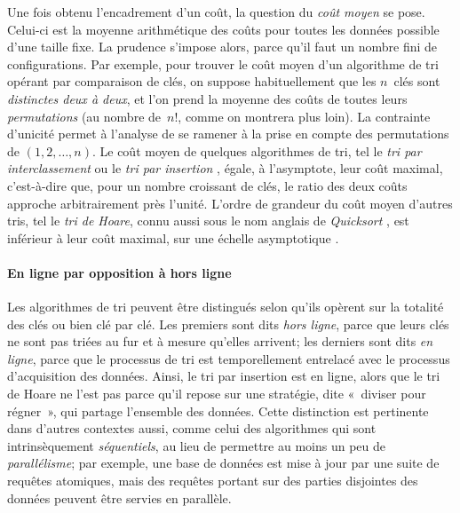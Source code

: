 Une fois obtenu l'encadrement d'un coût, la question du \emph{coût
moyen} \citep{VitterFlajolet_1990} \citep[\S{}1.2.10]{Knuth_1997} se
pose. Celui-ci est la moyenne arithmétique des coûts pour toutes les
données possible d'une taille fixe. La prudence s'impose alors, parce
qu'il faut un nombre fini de configurations. Par exemple, pour trouver
le coût moyen d'un algorithme de tri opérant par comparaison de clés,
on suppose habituellement que les \(n\)~clés sont \emph{distinctes
deux à deux}, et l'on prend la moyenne des coûts
de toutes leurs \emph{permutations} (au nombre
de~\(n!\), comme on montrera plus loin). La contrainte d'unicité
permet à l'analyse de se ramener à la prise en compte des permutations
de \((1,2,\dots,n)\). Le coût moyen de quelques algorithmes de tri,
tel le \emph{tri par interclassement} \cite[\S{}5.2.4]{Knuth_1998}
\cite[\S{}2.3]{CLRS_2009} ou le \emph{tri par insertion}
\cite[\S{}5.2.1]{Knuth_1998} \cite[\S{}2.1]{CLRS_2009}, égale, à
l'asymptote, leur coût maximal, c'est-à-dire que, pour un nombre
croissant de clés, le ratio des deux coûts approche arbitrairement
près l'unité. L'ordre de grandeur du
coût moyen d'autres tris, tel le \emph{tri de Hoare}, connu aussi sous
le nom anglais de \emph{Quicksort} \cite[\S{}5.2.2]{Knuth_1998}
\cite[\S{}7]{CLRS_2009}, est inférieur à leur coût maximal, sur une
échelle asymptotique \cite[\S{}9]{GrahamKnuthPatashnik_1994}.

\paragraph{En ligne par opposition à hors ligne}
\label{par:online_vs_offline}

Les algorithmes de tri peuvent être distingués selon qu'ils opèrent
sur la totalité des clés ou bien clé par clé. Les premiers sont dits
\emph{hors ligne}, parce que leurs clés
ne sont pas triées au fur et à mesure qu'elles arrivent; les derniers
sont dits \emph{en ligne}, parce que le
processus de tri est temporellement entrelacé avec le processus
d'acquisition des données. Ainsi, le tri par insertion est en ligne,
alors que le tri de Hoare ne l'est pas parce qu'il repose sur une
stratégie, dite «~diviser pour régner~», qui partage l'ensemble des
données. Cette distinction est pertinente dans d'autres contextes
aussi, comme celui des algorithmes qui sont intrinsèquement
\emph{séquentiels}, au lieu de permettre au moins un peu de
\emph{parallélisme}; par exemple, une base de données est mise à jour
par une suite de requêtes atomiques, mais des requêtes portant sur des
parties disjointes des données peuvent être servies en parallèle.

